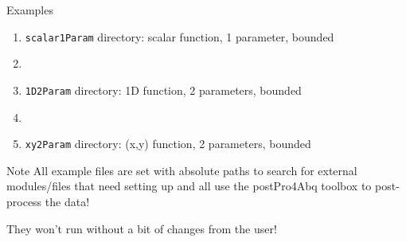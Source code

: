 \begin{frame}{Examples}
\vfill

\begin{enumerate}
\item \texttt{scalar1Param} directory:  scalar function, 1 parameter, bounded
\item[]
\item \texttt{1D2Param} directory: 1D function, 2 parameters, bounded
\item[]
\item \texttt{xy2Param} directory: (x,y) function, 2 parameters, bounded
\end{enumerate}
\vfill
\begin{block}{Note}\footnotesize
All example files are set with absolute paths to search for external modules/files that need setting up and all use the postPro4Abq toolbox to post-process the data!

They won't run without a bit of changes from the user!
\end{block}
\end{frame}